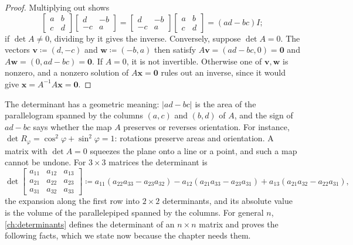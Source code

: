 \begin{proof}
Multiplying out shows
\[
\begin{bmatrix}a&b\\c&d\end{bmatrix}\begin{bmatrix}d&-b\\-c&a\end{bmatrix}=\begin{bmatrix}d&-b\\-c&a\end{bmatrix}\begin{bmatrix}a&b\\c&d\end{bmatrix}=(ad-bc)I;
\]
if $\det A\ne0$, dividing by it gives the inverse. Conversely, suppose $\det A=0$. The vectors $\mathbf v\coloneqq(d,-c)$ and $\mathbf w\coloneqq(-b,a)$ then satisfy $A\mathbf v=(ad-bc,0)=\mathbf 0$ and $A\mathbf w=(0,ad-bc)=\mathbf 0$. If $A=0$, it is not invertible. Otherwise one of $\mathbf v,\mathbf w$ is nonzero, and a nonzero solution of $A\mathbf x=\mathbf 0$ rules out an inverse, since it would give $\mathbf x=A^{-1}A\mathbf x=\mathbf 0$.
\end{proof}

The determinant has a geometric meaning: $|ad-bc|$ is the area of the parallelogram spanned by the columns $(a,c)$ and $(b,d)$ of $A$, and the sign of $ad-bc$ says whether the map $A$ preserves or reverses orientation. For instance, $\det R_\varphi=\cos^2\varphi+\sin^2\varphi=1$: rotations preserve areas and orientation. A matrix with $\det A=0$ squeezes the plane onto a line or a point, and such a map cannot be undone. For $3\times3$ matrices the determinant is
\[
\det\begin{bmatrix}a_{11}&a_{12}&a_{13}\\a_{21}&a_{22}&a_{23}\\a_{31}&a_{32}&a_{33}\end{bmatrix}\coloneqq a_{11}(a_{22}a_{33}-a_{23}a_{32})-a_{12}(a_{21}a_{33}-a_{23}a_{31})+a_{13}(a_{21}a_{32}-a_{22}a_{31}),
\]
the expansion along the first row into $2\times2$ determinants, and its absolute value is the volume of the parallelepiped spanned by the columns. For general $n$, \cref{ch:determinants} defines the determinant of an $n\times n$ matrix and proves the following facts, which we state now because the chapter needs them.

